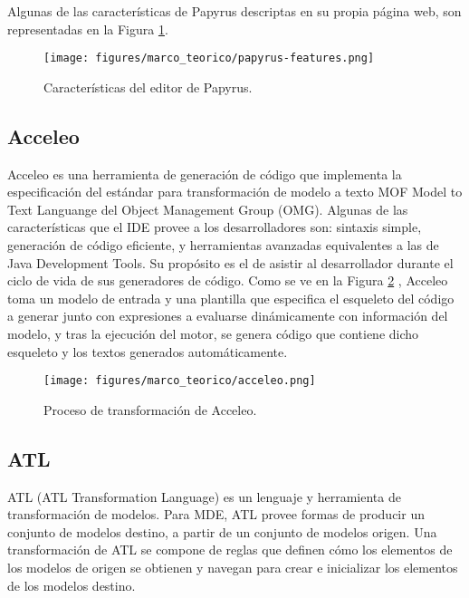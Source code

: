 Algunas de las características de Papyrus descriptas en su propia página web, son representadas en la Figura \ref{fig:marco:papyrus_editor}.

\begin{figure}[htbp]
    \centering
    \texttt{[image: figures/marco\_teorico/papyrus-features.png]}
    \caption{Características del editor de Papyrus. \cite{papyrus}}
    \label{fig:marco:papyrus_editor}
\end{figure}

\subsection{Acceleo}
Acceleo es una herramienta de generación de código que implementa la especificación del estándar para transformación de modelo a texto MOF Model to Text Languange del Object Management Group (OMG). Algunas de las características que el IDE provee a los desarrolladores son: sintaxis simple, generación de código eficiente, y herramientas avanzadas equivalentes a las de Java Development Tools. Su propósito es el de asistir al desarrollador durante el ciclo de vida de sus generadores de código. Como se ve en la Figura \ref{fig:marco:acceleo_transformation} \cite{acceleo}, Acceleo toma un modelo de entrada y una plantilla que especifica el esqueleto del código a generar junto con expresiones a evaluarse dinámicamente con información del modelo, y tras la ejecución del motor, se genera código que contiene dicho esqueleto y los textos generados automáticamente.

\begin{figure}[htbp]
    \centering
    \texttt{[image: figures/marco\_teorico/acceleo.png]}
    \caption{Proceso de transformación de Acceleo. \cite{acceleo}}
    \label{fig:marco:acceleo_transformation}
\end{figure}

\subsection{ATL}
ATL (ATL Transformation Language) es un lenguaje y herramienta de transformación de modelos. Para MDE, ATL provee formas de producir un conjunto de modelos destino, a partir de un conjunto de modelos origen. Una transformación de ATL se compone de reglas que definen cómo los elementos de los modelos de origen se obtienen y navegan para crear e inicializar los elementos de los modelos destino. \cite{atl}

